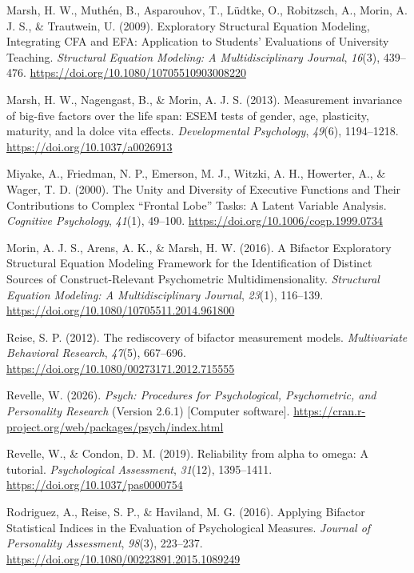 \documentclass[
  american,
  man,floatsintext]{apa7}
\newlength{\cslhangindent}
\newenvironment{CSLReferences}[2] %
 {\begin{list}{}{%
  \setlength{\itemindent}{0pt}
  \setlength{\leftmargin}{0pt}
  \setlength{\parsep}{0pt}
  \ifodd #1
   \setlength{\leftmargin}{\cslhangindent}
   \setlength{\itemindent}{-1\cslhangindent}
  \fi
  \setlength{\itemsep}{#2\baselineskip}}}
 {\end{list}}
\begin{document}
\begin{CSLReferences}{1}{0}
Marsh, H. W., Muthén, B., Asparouhov, T., Lüdtke, O., Robitzsch, A., Morin, A. J. S., \& Trautwein, U. (2009). Exploratory {Structural Equation Modeling}, {Integrating CFA} and {EFA}: {Application} to {Students}' {Evaluations} of {University Teaching}. \emph{Structural Equation Modeling: A Multidisciplinary Journal}, \emph{16}(3), 439--476. \url{https://doi.org/10.1080/10705510903008220}

Marsh, H. W., Nagengast, B., \& Morin, A. J. S. (2013). Measurement invariance of big-five factors over the life span: {ESEM} tests of gender, age, plasticity, maturity, and la dolce vita effects. \emph{Developmental Psychology}, \emph{49}(6), 1194--1218. \url{https://doi.org/10.1037/a0026913}

Miyake, A., Friedman, N. P., Emerson, M. J., Witzki, A. H., Howerter, A., \& Wager, T. D. (2000). The {Unity} and {Diversity} of {Executive Functions} and {Their Contributions} to {Complex} {``{Frontal Lobe}''} {Tasks}: {A Latent Variable Analysis}. \emph{Cognitive Psychology}, \emph{41}(1), 49--100. \url{https://doi.org/10.1006/cogp.1999.0734}

Morin, A. J. S., Arens, A. K., \& Marsh, H. W. (2016). A {Bifactor Exploratory Structural Equation Modeling Framework} for the {Identification} of {Distinct Sources} of {Construct-Relevant Psychometric Multidimensionality}. \emph{Structural Equation Modeling: A Multidisciplinary Journal}, \emph{23}(1), 116--139. \url{https://doi.org/10.1080/10705511.2014.961800}

Reise, S. P. (2012). The rediscovery of bifactor measurement models. \emph{Multivariate Behavioral Research}, \emph{47}(5), 667--696. \url{https://doi.org/10.1080/00273171.2012.715555}

Revelle, W. (2026). \emph{Psych: {Procedures} for {Psychological}, {Psychometric}, and {Personality Research}} (Version 2.6.1) {[}Computer software{]}. \url{https://cran.r-project.org/web/packages/psych/index.html}

Revelle, W., \& Condon, D. M. (2019). Reliability from alpha to omega: {A} tutorial. \emph{Psychological Assessment}, \emph{31}(12), 1395--1411. \url{https://doi.org/10.1037/pas0000754}

Rodriguez, A., Reise, S. P., \& Haviland, M. G. (2016). Applying {Bifactor Statistical Indices} in the {Evaluation} of {Psychological Measures}. \emph{Journal of Personality Assessment}, \emph{98}(3), 223--237. \url{https://doi.org/10.1080/00223891.2015.1089249}


\end{CSLReferences}
\end{document}
